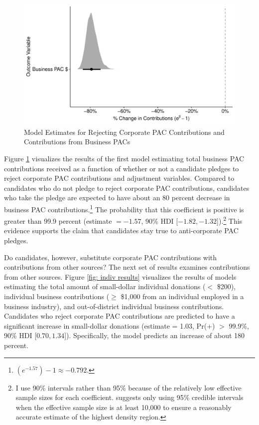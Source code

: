 \documentclass[12pt]{article}
\begin{document}
\begin{appendices}
\begin{figure}[!htb]
	\centering
	\includegraphics[width=0.9\linewidth]{pac_gamma_coef.pdf}  
  	\caption{Model Estimates for Rejecting Corporate PAC Contributions and Contributions from Business PACs}
	\label{fig: pac results}
\end{figure}

Figure \ref{fig: pac results} visualizes the results of the first model estimating total business PAC contributions received as a function of whether or not a candidate pledges to reject corporate PAC contributions and adjustment variables. Compared to candidates who do not pledge to reject corporate PAC contributions, candidates who take the pledge are expected to have about an 80 percent decrease in business PAC contributions.\footnote{$(e^{-1.57}) - 1 \approx -0.792$.} The probability that this coefficient is positive is greater than 99.9 percent (estimate $= -1.57$, 90\% HDI [$-1.82, -1.32$]).\footnote{I use 90\% intervals rather than 95\% because of the relatively low effective sample sizes for each coefficient. \citet{kruschke2014} suggests only using 95\% credible intervals when the effective sample size is at least 10,000 to ensure a reasonably accurate estimate of the highest density region.} This evidence supports the claim that candidates stay true to anti-corporate PAC pledges. 

Do candidates, however, substitute corporate PAC contributions with contributions from other sources? The next set of results examines contributions from other sources. Figure \ref{fig: indiv results} visualizes the results of models estimating the total amount of small-dollar individual donations ($<$ \$200), individual business contributions ($\geq$ \$1,000 from an individual employed in a business industry), and out-of-district individual business contributions. Candidates who reject corporate PAC contributions are predicted to have a significant increase in small-dollar donations (estimate = 1.03, Pr(+) $>$ 99.9\%, 90\% HDI [$0.70, 1.34$]). Specifically, the model predicts an increase of about 180 percent. 


\end{appendices}
\end{document}
